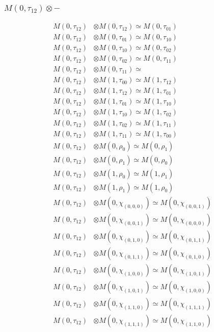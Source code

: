 \subsubsection{$ M(0,\tau_{12})\otimes -$}
\begin{align*}
M(0,\tau_{12}) &\otimes M(0,\tau_{12}) \simeq M(0,\tau_{01}) \\
M(0,\tau_{12}) &\otimes M(0,\tau_{01}) \simeq M(0,\tau_{10}) \\
M(0,\tau_{12}) &\otimes M(0,\tau_{10}) \simeq M(0,\tau_{02}) \\
M(0,\tau_{12}) &\otimes M(0,\tau_{02}) \simeq M(0,\tau_{11}) \\
M(0,\tau_{12}) &\otimes M(0,\tau_{11}) \simeq  \\
M(0,\tau_{12}) &\otimes M(1,\tau_{00}) \simeq M(1,\tau_{12}) \\
M(0,\tau_{12}) &\otimes M(1,\tau_{12}) \simeq M(1,\tau_{01}) \\
M(0,\tau_{12}) &\otimes M(1,\tau_{01}) \simeq M(1,\tau_{10}) \\
M(0,\tau_{12}) &\otimes M(1,\tau_{10}) \simeq M(1,\tau_{02}) \\
M(0,\tau_{12}) &\otimes M(1,\tau_{02}) \simeq M(1,\tau_{11}) \\
M(0,\tau_{12}) &\otimes M(1,\tau_{11}) \simeq M(1,\tau_{00}) \\
M(0,\tau_{12}) &\otimes M(0,\rho_{0}) \simeq M(0,\rho_{1}) \\
M(0,\tau_{12}) &\otimes M(0,\rho_{1}) \simeq M(0,\rho_{0}) \\
M(0,\tau_{12}) &\otimes M(1,\rho_{0}) \simeq M(1,\rho_{1}) \\
M(0,\tau_{12}) &\otimes M(1,\rho_{1}) \simeq M(1,\rho_{0}) \\
M(0,\tau_{12}) &\otimes M(0,\chi_{(0,0,0)}) \simeq M(0,\chi_{(0,0,1)}) \\
M(0,\tau_{12}) &\otimes M(0,\chi_{(0,0,1)}) \simeq M(0,\chi_{(0,0,0)}) \\
M(0,\tau_{12}) &\otimes M(0,\chi_{(0,1,0)}) \simeq M(0,\chi_{(0,1,1)}) \\
M(0,\tau_{12}) &\otimes M(0,\chi_{(0,1,1)}) \simeq M(0,\chi_{(0,1,0)}) \\
M(0,\tau_{12}) &\otimes M(0,\chi_{(1,0,0)}) \simeq M(0,\chi_{(1,0,1)}) \\
M(0,\tau_{12}) &\otimes M(0,\chi_{(1,0,1)}) \simeq M(0,\chi_{(1,0,0)}) \\
M(0,\tau_{12}) &\otimes M(0,\chi_{(1,1,0)}) \simeq M(0,\chi_{(1,1,1)}) \\
M(0,\tau_{12}) &\otimes M(0,\chi_{(1,1,1)}) \simeq M(0,\chi_{(1,1,0)}) \\

\end{align*}
